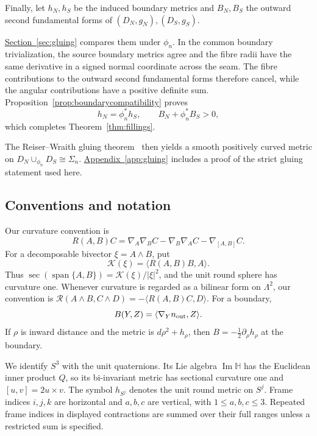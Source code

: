 \documentclass[12pt]{amsart}
\numberwithin{equation}{section}
\theoremstyle{remark}
\newcommand{\Hh}{\mathbb H}
\newcommand{\Ksec}{\operatorname{sec}}
\newcommand{\cK}{\mathcal K}
\begin{document}
Finally, let \(h_N,h_S\) be the induced boundary metrics and
\(B_N,B_S\) the outward second fundamental forms of
\((D_N,g_N),(D_S,g_S)\).

\hyperref[sec:gluing]{Section~\ref*{sec:gluing}} compares them
under \(\phi_n\). In the common boundary trivialization, the
source boundary metrics agree and the fibre radii have the same
derivative in a signed normal coordinate across the seam.
The fibre contributions to the outward second fundamental forms
therefore cancel, while the angular contributions have a positive
definite sum. Proposition~\ref{prop:boundarycompatibility} proves
\[
 h_N=\phi_n^*h_S,\qquad B_N+\phi_n^*B_S>0,
\]
which completes Theorem~\ref{thm:fillings}.

The Reiser--Wraith gluing theorem~\cite[Theorem~A(i), \(k=1\)]{RW} then yields a smooth positively curved metric on
\(D_N\cup_{\phi_n}D_S\cong\Sigma_n\).
\hyperref[app:gluing]{Appendix~\ref*{app:gluing}} includes a proof of the strict gluing statement used here.

\subsection{Conventions and notation}\label{subsec:conventions}
Our curvature convention is
\[
 R(A,B)C=\nabla_A\nabla_BC-\nabla_B\nabla_AC-\nabla_{[A,B]}C.
\]
For a decomposable bivector \(\xi=A\wedge B\), put
\[
 \cK(\xi)=\langle R(A,B)B,A\rangle.
\]
Thus \(\Ksec(\operatorname{span}\{A,B\})=\cK(\xi)/|\xi|^2\), and the
unit round sphere has curvature one. Whenever curvature is regarded as
a bilinear form on \(\Lambda^2\), our convention is
\(\mathcal R(A\wedge B,C\wedge D)=-\langle R(A,B)C,D\rangle\).
For a boundary,
\begin{equation}\label{eq:boundaryconvention}
 B(Y,Z)=\langle\nabla_Y n_{\rm out},Z\rangle.
\end{equation}
If \(\rho\) is inward distance and the metric
is \(d\rho^2+h_\rho\), then \(B=-\tfrac12\partial_\rho h_\rho\) at
the boundary.

We identify \(S^3\) with the unit quaternions. Its Lie algebra
\(\operatorname{Im}\Hh\) has the Euclidean inner product \(Q\), so its
bi-invariant metric has sectional curvature one and
\([u,v]=2u\times v\). The symbol \(h_{S^j}\) denotes the unit round
metric on \(S^j\). Frame indices \(i,j,k\) are horizontal and
\(a,b,c\) are vertical, with \(1\le a,b,c\le3\). Repeated frame
indices in displayed contractions are summed over their full ranges
unless a restricted sum is specified.
\end{document}
